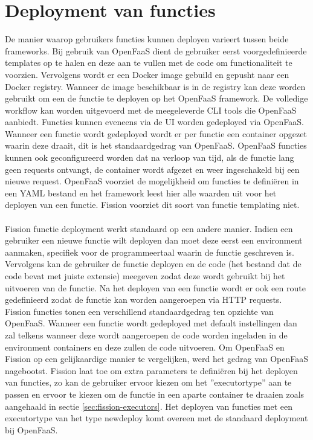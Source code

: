 \section{Deployment van functies}
De manier waarop gebruikers functies kunnen deployen varieert tussen beide frameworks. Bij gebruik van OpenFaaS dient de gebruiker eerst voorgedefinieerde templates op te halen en deze aan te vullen met de code om functionaliteit te voorzien. Vervolgens wordt er een Docker image gebuild en gepusht naar een Docker registry. Wanneer de image beschikbaar is in de registry kan deze worden gebruikt om een de functie te deployen op het OpenFaaS framework. De volledige workflow kan worden uitgevoerd met de meegeleverde CLI tools die OpenFaaS aanbiedt. Functies kunnen eveneens via de UI worden gedeployed via OpenFaaS. Wanneer een functie wordt gedeployed wordt er per functie een container opgezet waarin deze draait, dit is het standaardgedrag van OpenFaaS. OpenFaaS functies kunnen ook geconfigureerd worden dat na verloop van tijd, als de functie lang geen requests ontvangt, de container wordt afgezet en weer ingeschakeld bij een nieuwe request. OpenFaaS voorziet de mogelijkheid om functies te definiëren in een YAML bestand en het framework leest hier alle waarden uit voor het deployen van een functie. Fission voorziet dit soort van functie templating niet.
\\\\
Fission functie deployment werkt standaard op een andere manier. Indien een gebruiker een nieuwe functie wilt deployen dan moet deze eerst een environment aanmaken, specifiek voor de programmeertaal waarin de functie geschreven is. Vervolgens kan de gebruiker de functie deployen en de code (het bestand dat de code bevat met juiste extensie) meegeven zodat deze wordt gebruikt bij het uitvoeren van de functie. Na het deployen van een functie wordt er ook een route gedefinieerd zodat de functie kan worden aangeroepen via HTTP requests. Fission functies tonen een verschillend standaardgedrag ten opzichte van OpenFaaS. Wanneer een functie wordt gedeployed met default instellingen dan zal telkens wanneer deze wordt aangeroepen de code worden ingeladen in de environment containers en deze zullen de code uitvoeren. Om OpenFaaS en Fission op een gelijkaardige manier te vergelijken, werd het gedrag van OpenFaaS nagebootst. Fission laat toe om extra parameters te definiëren bij het deployen van functies, zo kan de gebruiker ervoor kiezen om het ''executortype'' aan te passen en ervoor te kiezen om de functie in een aparte container te draaien zoals aangehaald in sectie \ref{sec:fission-executors}. Het deployen van functies met een executortype van het type newdeploy komt overeen met de standaard deployment bij OpenFaaS.
